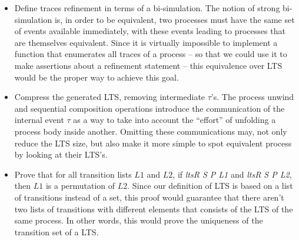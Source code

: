 \begin{itemize}
	\item Define traces refinement in terms of a bi-simulation. The notion of strong bi-simulation is, in order to be equivalent, two processes must have the same set of events available immediately, with these events leading to processes that are themselves equivalent. Since it is virtually impossible to implement a function that enumerates all traces of a process -- so that we could use it to make assertions about a refinement statement -- this equivalence over LTS would be the proper way to achieve this goal.
	\item Compress the generated LTS, removing intermediate $ \tau $'s. The process unwind and sequential composition operations introduce the communication of the internal event $ \tau $ as a way to take into account the ``effort'' of unfolding a process body inside another. Omitting these communications may, not only reduce the LTS size, but also make it more simple to spot equivalent process by looking at their LTS's.
	\item Prove that for all transition lists $ L1 $ and $ L2 $, if \emph{ltsR S P L1} and \emph{ltsR S P L2}, then $ L1 $ is a permutation of $ L2 $. Since our definition of LTS is based on a list of transitions instead of a set, this proof would guarantee that there aren't two lists of transitions with different elements that consists of the LTS of the same process. In other words, this would prove the uniqueness of the transition set of a LTS.
\end{itemize}